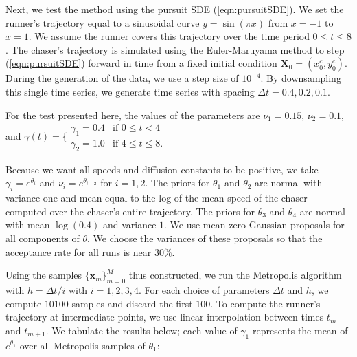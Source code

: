 \documentclass[graybox]{svmult}
\begin{document}
Next, we test the method using the pursuit SDE
(\ref{eqn:pursuitSDE}).  We set the runner's trajectory equal to a
sinusoidal curve $y = \sin (\pi x)$ from $x=-1$ to $x=1$.  We assume
the runner covers this trajectory over the time period $0 \leq t \leq
8$.  The chaser's trajectory is simulated using the Euler-Maruyama
method to step (\ref{eqn:pursuitSDE}) forward in time from a fixed
initial condition $\mathbf{X}_0 = (x^c_0, y^c_0)$.  During the
generation of the data, we use a step size of $10^{-4}$.  By
downsampling this single time series, we generate time series with
spacing $\Delta t = 0.4, 0.2, 0.1$.  

For the test presented here, the values of the parameters are  $\nu_1
= 0.15$, $\nu_2 = 0.1$, and $\gamma(t) =
\biggl\{
	\begin{array}{ll}
		\gamma_1 = 0.4  & \mbox{if } 0 \leq t < 4 \\
		\gamma_2 = 1.0 & \mbox{if } 4 \leq t \leq 8.
	\end{array}$

Because we want all speeds and diffusion constants to be positive, we
take $\gamma_i = e^{\theta_i}$ and $\nu_i = e^{\theta_{i+2}}$ for $i =
1, 2$.  The priors for $\theta_1$ and $\theta_2$ are normal with
variance one and mean equal to the log of the mean speed of the chaser computed over the chaser's
entire trajectory. The priors for $\theta_3$ and $\theta_4$ are normal with mean
$\log(0.4)$ and variance $1$.  We use mean zero Gaussian proposals for all
components of $\theta$.  We choose the variances of these proposals so
that the acceptance rate for all runs is near $30\%$.

Using the samples $\{\mathbf{x}_m\}^M_{m=0}$ thus constructed, we run
the Metropolis algorithm with $h = \Delta t / i$ with $i = 1, 2, 3,
4$.  For each choice of parameters $\Delta t$ and $h$, we compute $10100$ samples and discard the first $100$.  To compute the runner's trajectory at intermediate points, we use
linear interpolation between times $t_m$ and $t_{m+1}$.  We tabulate
the results below; each value of $\gamma_1$ represents the mean of
$e^{\theta_1}$ over all Metropolis samples of $\theta_1$:
\end{document}
